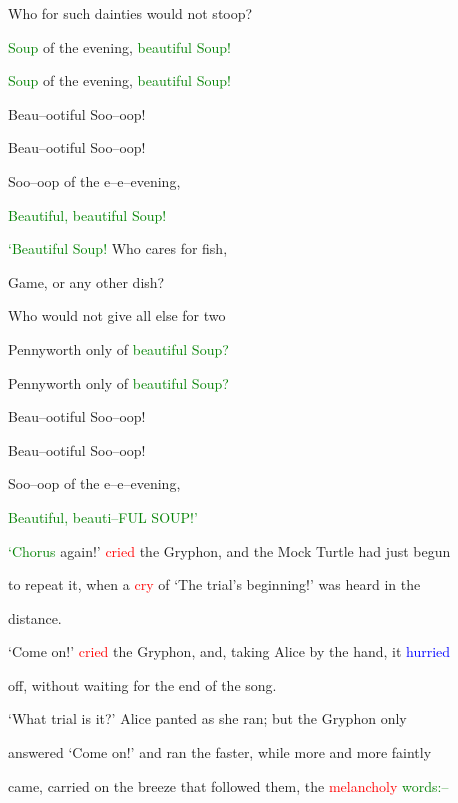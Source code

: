  Who for such dainties would not stoop?

 \textcolor{green}{Soup} of the evening, \textcolor{green}{beautiful} \textcolor{green}{Soup!}

 \textcolor{green}{Soup} of the evening, \textcolor{green}{beautiful} \textcolor{green}{Soup!}

 Beau--ootiful Soo--oop!

 Beau--ootiful Soo--oop!

 Soo--oop of the e--e--evening,

 \textcolor{green}{Beautiful,} \textcolor{green}{beautiful} \textcolor{green}{Soup!}



 \textcolor{green}{‘Beautiful} \textcolor{green}{Soup!} Who cares for fish,

 Game, or any other dish?

 Who would not give all else for two

 Pennyworth only of \textcolor{green}{beautiful} \textcolor{green}{Soup?}

 Pennyworth only of \textcolor{green}{beautiful} \textcolor{green}{Soup?}

 Beau--ootiful Soo--oop!

 Beau--ootiful Soo--oop!

 Soo--oop of the e--e--evening,

 \textcolor{green}{Beautiful,} \textcolor{green}{beauti--FUL} \textcolor{green}{SOUP!’}



 \textcolor{green}{‘Chorus} again!’ \textcolor{red}{cried} the Gryphon, and the Mock Turtle had just begun

 to repeat it, when a \textcolor{red}{cry} of ‘The trial’s beginning!’ was heard in the

 distance.



 ‘Come on!’ \textcolor{red}{cried} the Gryphon, and, taking Alice by the hand, it \textcolor{blue}{hurried}

 off, without \textcolor{BurntOrange}{waiting} for the end of the song.



 ‘What trial is it?’ Alice panted as she ran; but the Gryphon only

 answered ‘Come on!’ and ran the faster, while more and more faintly

 came, carried on the breeze that followed them, the \textcolor{red}{melancholy} \textcolor{green}{words:--}



